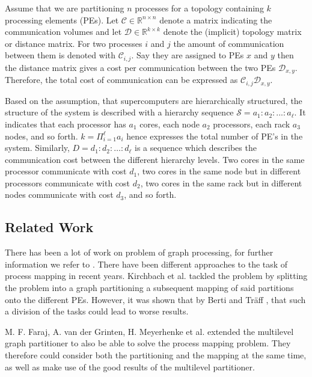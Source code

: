 \documentclass[acmsmall,nonacm,screen,review]{acmart}
\def\MdR{\ensuremath{\mathbb{R}}}
\begin{document}
Assume that we are partitioning $n$ processes for a topology containing $k$ processing elements (PEs).
Let $\mathcal{C}\in \MdR^{n \times n}$ denote a matrix indicating the communication volumes and 
let $\mathcal{D}\in \MdR^{k \times k}$ denote the (implicit) topology matrix or distance matrix.
For two processes $i$ and $j$ the amount of communication between them is denoted with $\mathcal{C}_{i,j}$. 
Say they are assigned to PEs $x$ and $y$ then the distance matrix gives a cost per communication
between the two PEs $\mathcal{D}_{x,y}$. Therefore, the total cost of communication can be expressed as 
$\mathcal{C}_{i,j}\mathcal{D}_{x,y}$.
 
Based on the assumption, that supercomputers are hierarchically structured, the structure of the system
is described with a hierarchy sequence $\mathcal{S}=a_1: a_2: ...:a_\ell$. It indicates that each 
processor has $a_1$ cores, each node $a_2$ processors, each rack $a_3$ nodes, and so forth. 
$k=\Pi_{i=1}^{\ell}a_i$ hence expresses the total number of PE's in the system.
Similarly, $D = d_1:d_2:\ldots:d_\ell$ is a sequence which describes the communication cost 
between the different hierarchy levels. Two cores in the same processor communicate with cost 
$d_1$, two cores in the same node but in different processors communicate with cost $d_2$, two 
cores in the same rack but in different nodes communicate with cost $d_3$, and so forth.

\subsection{Related Work}
There has been a lot of work on problem of graph processing, for further information we refer to
\cite{bichot2013graph} \cite{bulucc2016recent} \cite{schulz2018graph}.
There have been different approaches to the task of process mapping in recent years. Kirchbach et al.
\cite{kirchbach2020better} tackled the problem by splitting the problem into a graph partitioning 
a subsequent mapping of said partitions onto the different PEs. However, it was shown that by Berti 
and Träff \cite{berti2006mpi}, that such a division of the tasks could lead to worse results.

M. F. Faraj, A. van der Grinten, H. Meyerhenke et al. \cite{Far20} extended the multilevel 
graph partitioner to also be able to solve the process mapping problem. They therefore could 
consider both the partitioning and the mapping at the same time, as well as make use of the good 
results of the multilevel partitioner.
\end{document}
